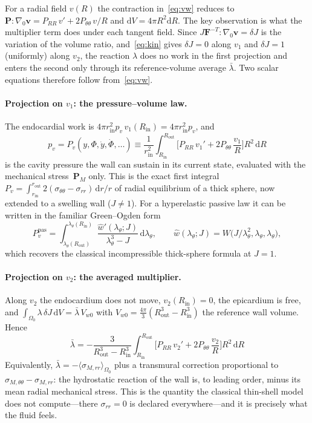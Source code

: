 \documentclass[11pt,a4paper]{article}
\newcommand{\bF}{\mathbf F}
\newcommand{\bP}{\mathbf P}
\newcommand{\bv}{\mathbf v}
\newcommand{\dd}{\mathrm d}
\newcommand{\Grad}{\nabla_{\!0}}
\newcommand{\Rin}{R_{\mathrm{in}}}
\newcommand{\Rout}{R_{\mathrm{out}}}
\newcommand{\rin}{r_{\mathrm{in}}}
\newcommand{\lt}{\lambda_\theta}
\newcommand{\lb}{\bar\lambda}
\newcommand{\Vw}{V_{w0}}
\newcommand{\Pm}{\bP_{\!M}}
\begin{document}
For a radial field $v(R)$ the contraction in~\eqref{eq:vw} reduces to $\bP:\Grad\bv=P_{RR}\,v'+2P_{\theta\theta}\,v/R$ and $\dd V=4\pi R^2\dd R$. The key observation is what the multiplier term does under each tangent field. Since $J\bF^{-T}:\Grad\bv=\delta J$ is the variation of the volume ratio, and~\eqref{eq:kin} gives $\delta J=0$ along $v_1$ and $\delta J=1$ (uniformly) along $v_2$, the reaction $\lambda$ does no work in the first projection and enters the second only through its reference-volume average $\lb$. Two scalar equations therefore follow from~\eqref{eq:vw}.

\paragraph{Projection on $v_1$: the pressure--volume law.}
The endocardial work is $4\pi\rin^2 p_v\,v_1(\Rin)=4\pi\rin^2p_v$, and
\begin{equation}
  \boxed{\;
  p_v=P_v(y,\Phi,\dot y,\dot\Phi,\ldots)
  \equiv\frac{1}{\rin^2}\int_{\Rin}^{\Rout}
  \Big[P_{RR}\,v_1'+2P_{\theta\theta}\,\frac{v_1}{R}\Big]R^2\,\dd R\; }
  \label{eq:Pv}
\end{equation}
is the cavity pressure the wall can sustain in its current state, evaluated with the mechanical stress~$\Pm$ only. This is the exact first integral $P_v=\int_{\rin}^{r_{\mathrm{out}}}2(\sigma_{\theta\theta}-\sigma_{rr})\,\dd r/r$ of radial equilibrium of a thick sphere, now extended to a swelling wall ($J\neq1$). For a hyperelastic passive law it can be written in the familiar Green--Ogden form
\begin{equation}
  P_v^{\mathrm{pas}}=\int_{\lt(\Rout)}^{\lt(\Rin)}
  \frac{\hat w'(\lt;J)}{\lt^3-J}\,\dd\lt ,\qquad
  \hat w(\lt;J)=W\big(J/\lt^2,\lt,\lt\big),
  \label{eq:GreenOgden}
\end{equation}
which recovers the classical incompressible thick-sphere formula at $J=1$.

\paragraph{Projection on $v_2$: the averaged multiplier.}
Along $v_2$ the endocardium does not move, $v_2(\Rin)=0$, the epicardium is free, and $\int_{\Omega_0}\lambda\,\delta J\,\dd V=\lb\,\Vw$ with $\Vw=\tfrac{4\pi}{3}(\Rout^3-\Rin^3)$ the reference wall volume. Hence
\begin{equation}
  \boxed{\;
  \lb=-\frac{3}{\Rout^3-\Rin^3}\int_{\Rin}^{\Rout}
  \Big[P_{RR}\,v_2'+2P_{\theta\theta}\,\frac{v_2}{R}\Big]R^2\,\dd R\; }
  \label{eq:lb}
\end{equation}
Equivalently, $\lb=-\langle\sigma_{M,rr}\rangle_{\Omega_0}$ plus a transmural correction proportional to $\sigma_{M,\theta\theta}-\sigma_{M,rr}$: the hydrostatic reaction of the wall is, to leading order, minus its mean radial mechanical stress. This is the quantity the classical thin-shell model does not compute---there $\sigma_{rr}=0$ is declared everywhere---and it is precisely what the fluid feels.
\end{document}
